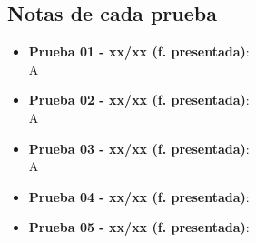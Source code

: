    \subsection{Notas de cada prueba}
    \begin{itemize}
        \item[§] \textbf{Prueba 01 - xx/xx (f. presentada)}:\\
        A
        \item[§] \textbf{Prueba 02 - xx/xx (f. presentada)}:\\
        A
        \item[§] \textbf{Prueba 03 - xx/xx (f. presentada)}:\\
        A
        \item[§] \textbf{Prueba 04 - xx/xx (f. presentada)}:
        \item[§] \textbf{Prueba 05 - xx/xx (f. presentada)}:
    \end{itemize}